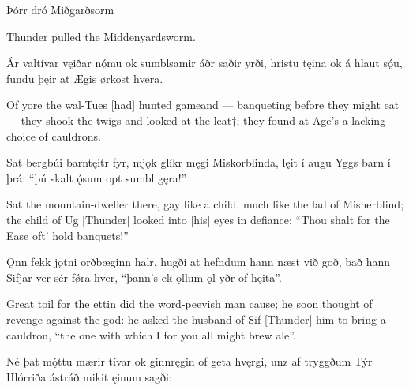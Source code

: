 Þórr dró Miðgarðsorm

Thunder pulled the Middenyardsworm.

Ár valtívar \hld vęiðar nǫ́mu
ok sumblsamir \hld áðr saðir yrði,
hristu tęina \hld ok á hlaut sǫ́u,
fundu þęir at Ægis \hld ørkost hvera.

Of yore the wal-Tues [had] hunted game\footnotemark[1] and — banqueting before they might eat\footnotemark[1] — they shook the twigs and looked at the leat†; they found at Age’s a lacking choice of cauldrons.

Sat bergbúi \hld barntęitr fyr,
mjǫk glíkr męgi \hld Miskorblinda,
lęit í augu \hld Yggs barn í þrá:
“þú skalt ǫ́sum \hld opt sumbl gęra!”

Sat the mountain-dweller there, gay like a child, much like the lad of Misherblind; the child of Ug [Thunder] looked into [his] eyes in defiance: “Thou shalt for the Ease oft’ hold banquets!”

Ǫnn fekk jǫtni \hld orðbæginn halr,
hugði at hefndum \hld hann næst við goð,
bað hann Sifjar ver \hld sér fǿra hver,
“þann’s ek ǫllum ǫl \hld yðr of hęita”.

Great toil for the ettin did the word-peevish man cause; he soon thought of revenge against the god: he asked the husband of Sif [Thunder] him to bring a cauldron, “the one with which I for you all might brew ale”.

Né þat mǫ́ttu \hld mærir tívar
ok ginnręgin \hld of geta hvęrgi,
unz af tryggðum \hld Týr Hlórriða
ástráð mikit \hld ęinum sagði: 
